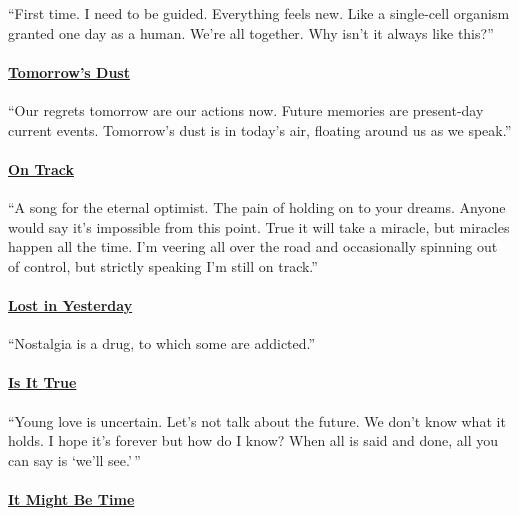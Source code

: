 \documentclass[
]{article}
\begin{document}
``First time. I need to be guided. Everything feels new. Like a
single-cell organism granted one day as a human. We're all together. Why
isn't it always like this?''

\paragraph{\texorpdfstring{\href{https://open.spotify.com/track/666PdikRnUzdvjT9p5wWND?si=dfbd52c94c534ccf}{\textbf{Tomorrow's
Dust}}}{Tomorrow's Dust}}\label{tomorrows-dust}

``Our regrets tomorrow are our actions now. Future memories are
present-day current events. Tomorrow's dust is in today's air, floating
around us as we speak.''

\paragraph{\texorpdfstring{\href{https://open.spotify.com/track/0IuE6FnXPCdZ8NLuuvJRhb?si=fcce0f91761b458a}{\textbf{On
Track}}}{On Track}}\label{on-track}

``A song for the eternal optimist. The pain of holding on to your
dreams. Anyone would say it's impossible from this point. True it will
take a miracle, but miracles happen all the time. I'm veering all over
the road and occasionally spinning out of control, but strictly speaking
I'm still on track.''

\paragraph{\texorpdfstring{\href{https://open.spotify.com/track/5JWPUEov2wlX7c0jhYZpeB?si=6dd4f26b42404b23}{\textbf{Lost
in Yesterday}}}{Lost in Yesterday}}\label{lost-in-yesterday}

``Nostalgia is a drug, to which some are addicted.''

\paragraph{\texorpdfstring{\href{https://open.spotify.com/track/6RZmhpvukfyeSURhf4kZ0d?si=e26f0949be2d4391}{\textbf{Is
It True}}}{Is It True}}\label{is-it-true}

``Young love is uncertain. Let's not talk about the future. We don't
know what it holds. I hope it's forever but how do I know? When all is
said and done, all you can say is `we'll see.'\,''

\paragraph{\texorpdfstring{\href{https://open.spotify.com/track/558ubozatFQlweufvHa3Ip?si=b12766a9c8ba4553}{\textbf{It
Might Be Time}}}{It Might Be Time}}\label{it-might-be-time}
\end{document}
